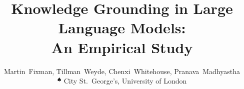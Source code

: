 \documentclass[conference]{IEEEtran}
\title{Knowledge Grounding in Large Language Models: \\ An Empirical Study}
\author{%
	Martin~Fixman\spade{}, Tillman~Weyde\spade{}, Chenxi~Whitehouse\spade{}, Pranava~Madhyastha\spade{} \\
	$\phantom{}^\spadesuit{}$ City St.\ George's, University of London%
}
\begin{document}
\maketitle{}

\begin{abstract}
	
\end{abstract}














% 


\end{document}
